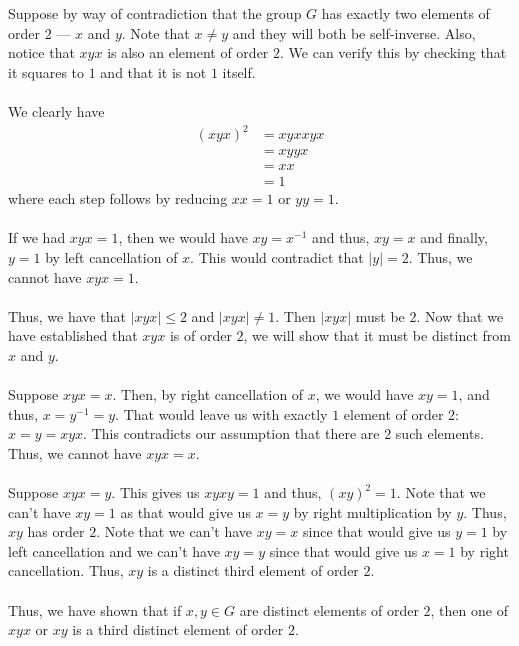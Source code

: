 \documentclass[12 pt, letterpaper]{hmcpset}
\begin{document}
\begin{solution}
	Suppose by way of contradiction that the group $G$  has exactly two elements of order $2$ ---  $x$  and $y$. Note that $x \neq y$ and they will both be self-inverse. Also, notice that $xyx$ is also an element of order $2$. We can verify this by checking that it squares to $1$ and that it is not $1$ itself. \\\\
	We clearly have
	\[
		\begin{split}
			(xyx)^{2} & = xyxxyx \\
				  & = xyyx \\
				  & = xx \\
				  & = 1
		\end{split}
	\]
	where each step follows by reducing $xx = 1$ or $yy = 1$. \\\\
	If we had $xyx = 1$, then we would have $xy = x^{-1}$ and thus, $xy = x$ and finally, $y = 1$ by left cancellation of $x$. This would contradict that $\vert y \vert = 2$. Thus, we cannot have $xyx = 1$. \\\\
	Thus, we have that $\vert xyx \vert \le 2$ and $\vert xyx \vert \neq 1$. Then $\vert xyx \vert$ must be $2$. Now that we have established that $xyx$ is of order $2$, we will show that it must be distinct from $x$ and $y$. \\\\
	Suppose $xyx = x$. Then, by right cancellation of $x$, we would have $xy = 1$, and thus, $x = y^{-1} = y$. That would leave us with exactly $1$ element of order $2$: $x = y = xyx$. This contradicts our assumption that there are $2$ such elements. Thus, we cannot have $xyx = x$. \\\\
	Suppose $xyx = y$. This gives us $xyxy = 1$ and thus, $(xy)^{2} = 1$. Note that we can't have $xy = 1$ as that would give us $x = y$ by right multiplication by $y$. Thus, $xy$ has order $2$. Note that we can't have $xy = x$ since that would give us $y = 1$ by left cancellation and we can't have $xy = y$ since that would give us $x = 1$ by right cancellation. Thus, $xy$ is a distinct third element of order $2$. \\\\
	Thus, we have shown that if $x, y \in G$ are distinct elements of order $2$, then one of $xyx$ or $xy$ is a third distinct element of order $2$.
\end{solution}
\end{document}
